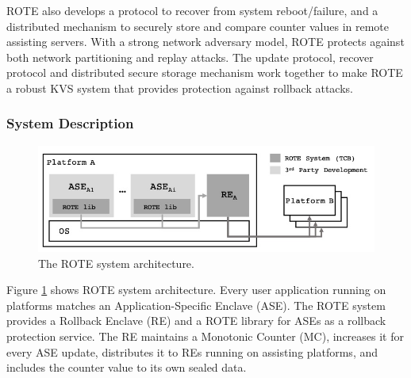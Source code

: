ROTE also develops a protocol to recover from system reboot/failure, and a distributed 
mechanism to securely store and compare counter values in remote assisting servers.
With a strong network adversary model, ROTE protects
against both network partitioning and replay attacks. The update protocol, 
recover protocol and distributed secure storage mechanism work together to make ROTE 
a robust KVS system that provides protection against rollback attacks.



\subsubsection{System Description}
\begin{figure}
    \centering
        \includegraphics[width=.45\textwidth]{rote_sys}
        \caption[title]{The ROTE system architecture.}
        \label{fig:rote_sys}
\end{figure}

Figure \ref{fig:rote_sys} shows ROTE system architecture. Every user application running on platforms matches an Application-Specific Enclave (ASE). The ROTE system provides a Rollback Enclave (RE) and a ROTE library for ASEs as a rollback protection service. The RE maintains a Monotonic Counter (MC), increases it for every ASE update, distributes it to REs running on assisting platforms, and includes the counter value to its own sealed data. 

